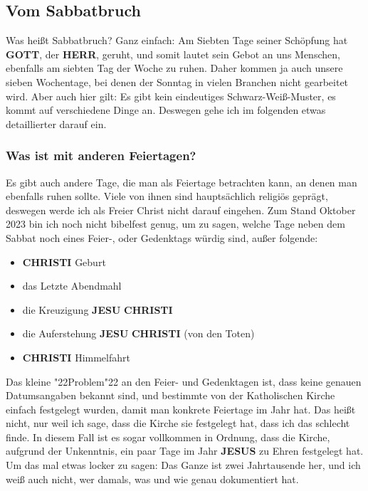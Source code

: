 \documentclass[10pt,a5paper]{article}
\newcommand{\Christi}[0]{\textbf{CHRISTI}}
\newcommand{\Gott}[0]{\textbf{GOTT}}
\newcommand{\Herr}[0]{\textbf{HERR}}
\newcommand{\Jesus}[0]{\textbf{JESUS}}
\newcommand{\Jesu}[0]{\textbf{JESU}}
\newcommand{\q}[1]{\char"22{#1}\char"22 }
\begin{document}
	\subsection{Vom Sabbatbruch}
		Was hei{\ss}t Sabbatbruch?
		Ganz einfach:
		Am Siebten Tage seiner Sch\"opfung hat {\Gott},
		der {\Herr},
		geruht,
		und somit lautet sein Gebot an uns Menschen,
		ebenfalls am siebten Tag der Woche zu ruhen.
		Daher kommen ja auch unsere sieben Wochentage,
		bei denen der Sonntag in vielen Branchen nicht gearbeitet wird.
		Aber auch hier gilt:
		Es gibt kein eindeutiges Schwarz-Wei{\ss}-Muster,
		es kommt auf verschiedene Dinge an.
		Deswegen gehe ich im folgenden etwas detaillierter darauf ein.
	
	\subsubsection{Was ist mit anderen Feiertagen?}
		Es gibt auch andere Tage,
		die man als Feiertage betrachten kann,
		an denen man ebenfalls ruhen sollte.
		Viele von ihnen sind haupts\"achlich religi\"os gepr\"agt,
		deswegen werde ich als Freier Christ nicht darauf eingehen.
		Zum Stand Oktober 2023 bin ich noch nicht bibelfest genug,
		um zu sagen,
		welche Tage neben dem Sabbat noch eines Feier-,
		oder Gedenktags w\"urdig sind,
		au{\ss}er folgende:
		\begin{itemize}[noitemsep]
			\item {\Christi} Geburt
			\item das Letzte Abendmahl
			\item die Kreuzigung {\Jesu} {\Christi}
			\item die Auferstehung {\Jesu} {\Christi} (von den Toten)
			\item {\Christi} Himmelfahrt
		\end{itemize}
		Das kleine \q{Problem} an den Feier- und Gedenktagen ist,
		dass keine genauen Datumsangaben bekannt sind,
		und bestimmte von der Katholischen Kirche einfach festgelegt wurden,
		damit man konkrete Feiertage im Jahr hat.
		Das hei{\ss}t nicht,
		nur weil ich sage,
		dass die Kirche sie festgelegt hat,
		dass ich das schlecht finde.
		In diesem Fall ist es sogar vollkommen in Ordnung,
		dass die Kirche,
		aufgrund der Unkenntnis,
		ein paar Tage im Jahr {\Jesus} zu Ehren festgelegt hat.
		Um das mal etwas locker zu sagen:
		Das Ganze ist zwei Jahrtausende her,
		und ich wei{\ss} auch nicht,
		wer damals,
		was und wie genau dokumentiert hat.
\end{document}

